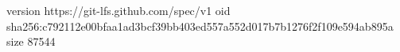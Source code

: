 version https://git-lfs.github.com/spec/v1
oid sha256:c792112e00bfaa1ad3bcf39bb403ed557a552d017b7b1276f2f109e594ab895a
size 87544

